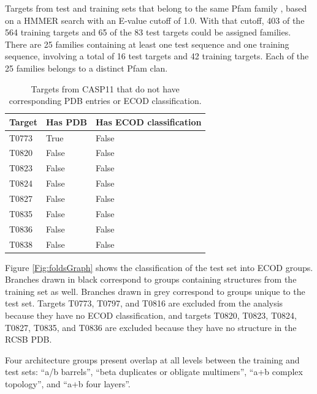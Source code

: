\documentclass[letter,10pt]{article}
\begin{document}
\begin{table}[H]
\begin{center}
\caption{Targets from test and training sets that belong to the same Pfam
family \cite{finn2016pfam}, based on a HMMER search \cite{finn2015hmmer} with an
E-value cutoff of 1.0. With that cutoff, 403 of the 564 training
targets and 65 of the 83 test targets could be assigned
families. There are 25 families containing at least one test sequence
and one training sequence, involving a total of 16 test targets and 42
training targets. Each of the 25 families belongs to a distinct Pfam
clan.}
%
\label{Tbl:SharedPfam}
\end{center}
\end{table}

\begin{table}[H]
\begin{center}
\begin{tabular}{ l | l | l }

    Target & Has PDB & Has ECOD classification \\
    \hline
    T0773 &True &False\\
    T0820 &False &False\\
    T0823 &False &False\\
    T0824 &False &False\\
    T0827 &False &False\\
    T0835 &False &False\\
    T0836 &False &False\\
    T0838 &False &False\\
\end{tabular}
   
\caption{Targets from CASP11 that do not have corresponding PDB entries or ECOD classification.}
%
\label{Tbl:CASP11PDB_ECOD}
\end{center}
\end{table}


Figure \ref{Fig:foldsGraph} shows the classification of the test set
into ECOD groups. Branches drawn in black correspond to groups
containing structures from the training set as well. Branches drawn in
grey correspond to groups unique to the test set. Targets T0773,
T0797, and T0816 are excluded from the analysis because they have no
ECOD classification, and targets T0820, T0823, T0824, T0827, T0835,
and T0836 are excluded because they have no structure in the RCSB PDB.

Four architecture groups present overlap at all levels between the
training and test sets: ``a/b barrels'', ``beta duplicates or obligate
multimers'', ``a+b complex topology'', and ``a+b four layers''.
\end{document}
